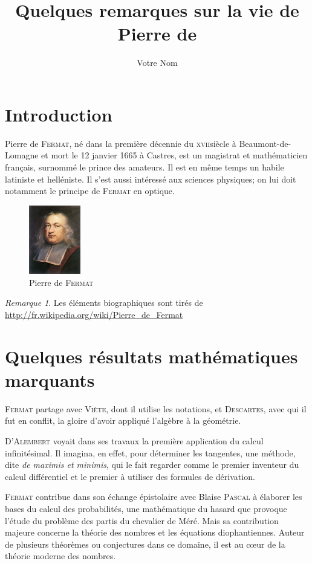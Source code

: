\documentclass[a4paper,11pt]{article}
\title{Quelques remarques sur la vie de Pierre de \fermat}
\author{Votre Nom}
\theoremstyle{plain}
\theoremstyle{definition}
\theoremstyle{remark}
\newtheorem*{rmk}{Remarque}
\newcommand{\nom}[1]{\textsc{#1}\xspace}
\newcommand{\fermat}{\nom{Fermat}}
\begin{document}
\maketitle
\tableofcontents

\section*{Introduction}
Pierre de \fermat, né dans la première décennie du \textsc{xvii}\ieme siècle à Beaumont-de-Lomagne et mort le 12 janvier 1665 à Castres, est un magistrat et mathématicien français, surnommé \flqq le prince des amateurs\frqq. Il est en même temps un habile latiniste et helléniste. Il s'est aussi intéressé aux sciences physiques; on lui doit notamment le principe de \fermat en optique.

\begin{figure}
\centering
\includegraphics[width=0.2\textwidth]{fermat}
\caption{Pierre de \fermat}
\end{figure}%


\begin{rmk}
Les éléments biographiques sont tirés de \url{http://fr.wikipedia.org/wiki/Pierre_de_Fermat}
\end{rmk}




\section{Quelques résultats mathématiques marquants}
\fermat partage avec \textsc{Viète}, dont il utilise les notations, et \textsc{Descartes}, avec qui il fut en conflit, la gloire d'avoir appliqué l'algèbre à la géométrie.

\textsc{D'Alembert} voyait dans ses travaux la première application du calcul infinitésimal. Il imagina, en effet, pour déterminer les tangentes, une méthode, dite \textit{de maximis et minimis}, qui le fait regarder comme le premier inventeur du calcul différentiel et le premier à utiliser des formules de dérivation.

\fermat contribue dans son échange épistolaire avec Blaise \textsc{Pascal} à élaborer les bases du calcul des probabilités, une mathématique du hasard que provoque l'étude du problème des partis du chevalier de Méré. Mais sa contribution majeure concerne la théorie des nombres et les équations diophantiennes. Auteur de plusieurs théorèmes ou conjectures dans ce domaine, il est au cœur de la \flqq théorie moderne des nombres\frqq.
\end{document}
